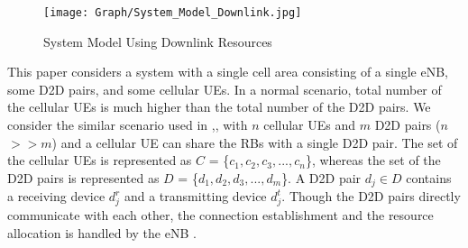 \documentclass[times]{dacauth}
\begin{document}
\begin{figure}[t]
	{ %
		\setlength{\fboxsep}{1.5pt}%
		\setlength{\fboxrule}{1.5pt}%
		\centering
		\texttt{[image: Graph/System\_Model\_Downlink.jpg]}
		\caption{System Model Using Downlink Resources} \label{fig:system_model}
	}
\end{figure}

%			

\noindent
This paper considers a system with a single cell area consisting of a single eNB, some D2D pairs, and some cellular UEs. 
In a normal scenario, total number of the cellular UEs is much higher than the total number of the D2D pairs. We consider the similar scenario used in \cite{lora},\cite{zulhasnine},\cite{dara} with $n$ cellular UEs and $m$ D2D pairs ($n$$>>$$m$) and a cellular UE can share the RBs with a single D2D pair.
The set of the cellular UEs is represented as $C$ = \{$ c_{1}, c_{2}, c_{3}, ..., c_{n} $\},  
whereas the set of the D2D pairs is represented as $D$ = \{$ d_{1}, d_{2}, d_{3}, ..., d_{m} $\}. 
A D2D pair $d_{j} \in D$ contains a receiving device $d_j^r$ and a transmitting device $d_j^t$. Though the D2D pairs directly communicate with each other, the connection establishment and the resource allocation is handled by the eNB \cite{dara}. 
\end{document}
